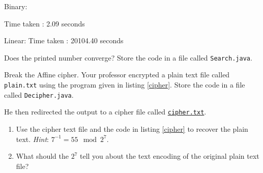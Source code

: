 \documentclass{homework}
\newcommand\callit[1]{Store the code in a file called \texttt{#1}.}
\begin{document}
\begin{sol}
  Binary: 

 Time taken : 2.09 seconds 

 Linear: 
 Time taken : 20104.40 seconds 

\end{sol}

% 

Does the printed number converge? \callit{Search.java}

\question Break the Affine cipher. Your professor encrypted a plain text
file called \texttt{plain.txt} using the program given in listing
\ref{cipher}. \callit{Decipher.java}

He then redirected the output to a cipher file called
\href{https://tinyurl.com/24pjud2t}{\texttt{cipher.txt}}.

\begin{enumerate}
  \item Use the cipher text file and the code in listing \ref{cipher} to
        recover the plain text. \textit{Hint}: $7^{-1} = 55 \mod 2^7$.
  \item What should the $2^7$ tell you about the text encoding of the
        original plain text file?
\end{enumerate}
\end{document}
